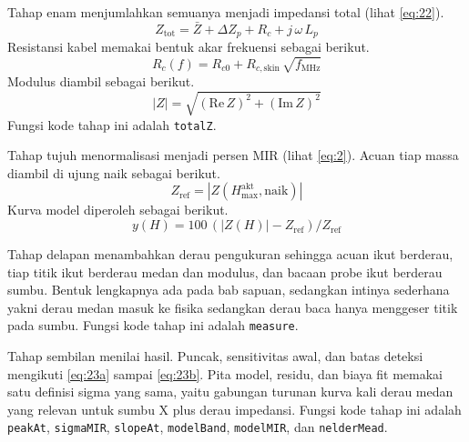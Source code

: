 \documentclass[a4paper,11pt]{article}
\begin{document}
Tahap enam menjumlahkan semuanya menjadi impedansi total
(lihat \eqref{eq:22}).
\begin{equation*}
Z_{\mathrm{tot}} = \bar Z + \Delta Z_{p} + R_{c} + j\,\omega\,L_{p}
\end{equation*}
Resistansi kabel memakai bentuk akar frekuensi sebagai berikut.
\begin{equation*}
R_{c}(f) = R_{c0} + R_{c,\mathrm{skin}}\,\sqrt{f_{\mathrm{MHz}}}
\end{equation*}
Modulus diambil sebagai berikut.
\begin{equation*}
|Z| = \sqrt{(\mathrm{Re}\,Z)^{2}+(\mathrm{Im}\,Z)^{2}}
\end{equation*}
Fungsi kode tahap ini adalah \texttt{totalZ}.

Tahap tujuh menormalisasi menjadi persen MIR
(lihat \eqref{eq:2}).
Acuan tiap massa diambil di ujung naik sebagai berikut.
\begin{equation*}
Z_{\mathrm{ref}} = |Z(H_{\max}^{\mathrm{akt}},\mathrm{naik})|
\end{equation*}
Kurva model diperoleh sebagai berikut.
\begin{equation*}
y(H) = 100\,(|Z(H)|-Z_{\mathrm{ref}})/Z_{\mathrm{ref}}
\end{equation*}

Tahap delapan menambahkan derau pengukuran sehingga acuan ikut berderau,
tiap titik ikut berderau medan dan modulus, dan bacaan probe ikut berderau
sumbu. Bentuk lengkapnya ada pada bab sapuan, sedangkan intinya sederhana
yakni derau medan masuk ke fisika sedangkan derau baca hanya menggeser
titik pada sumbu. Fungsi kode tahap ini adalah \texttt{measure}.

Tahap sembilan menilai hasil.
Puncak, sensitivitas awal, dan batas deteksi mengikuti
\eqref{eq:23a} sampai \eqref{eq:23b}.
Pita model, residu, dan biaya fit memakai satu definisi sigma yang sama,
yaitu gabungan turunan kurva kali derau medan yang relevan untuk sumbu X
plus derau impedansi.
Fungsi kode tahap ini adalah \texttt{peakAt}, \texttt{sigmaMIR},
\texttt{slopeAt}, \texttt{modelBand}, \texttt{modelMIR},
dan \texttt{nelderMead}.
\end{document}
